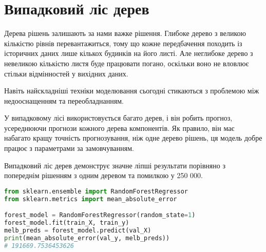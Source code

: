 \chapter{Випадковий ліс дерев}\label{cha:random_forest_tree}
Дерева рішень залишають за нами важке рішення.
Глибоке дерево з великою кількістю рівнів перевантажиться, тому що кожне передбачення походить із історичних даних лише кількох будинків на його листі.
Але неглибоке дерево з невеликою кількістю листя буде працювати погано, оскільки воно не вловлює стільки відмінностей у вихідних даних.

Навіть найскладніші техніки моделювання сьогодні стикаються з проблемою між недооснащенням та переобладнанням.

У випадковому лісі використовується багато дерев, і він робить прогноз, усереднюючи прогнози кожного дерева компонентів.
Як правило, він має набагато кращу точність прогнозування, ніж одне дерево рішень, ця модель добре працює з параметрами за замовчуванням.

Випадковий ліс дерев демонструє значне ліпші результати порівняно з попереднім рішенням з одним деревом та помилкою у 250 000.

\begin{lstlisting}[style=light, language=Python,label={lst:vectorimg},caption=Random Forest Tree]
from sklearn.ensemble import RandomForestRegressor
from sklearn.metrics import mean_absolute_error

forest_model = RandomForestRegressor(random_state=1)
forest_model.fit(train_X, train_y)
melb_preds = forest_model.predict(val_X)
print(mean_absolute_error(val_y, melb_preds))
# 191669.7536453626
\end{lstlisting}
